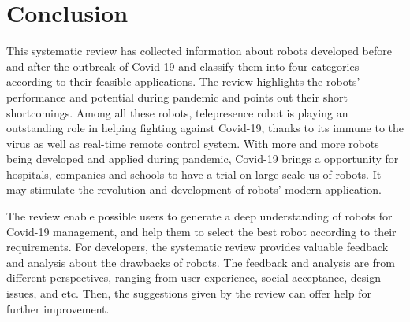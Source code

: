 \documentclass[a4paper]{article}
\begin{document}
\section{Conclusion}
    This systematic review has collected information about robots developed before and after the outbreak of Covid-19 and classify them into four categories according to their feasible applications. The review highlights the robots' performance and potential during pandemic and points out their short shortcomings. Among all these robots, telepresence robot is playing an outstanding role in helping fighting against Covid-19, thanks to its immune to the virus as well as real-time remote control system. With more and more robots being developed and applied during pandemic, Covid-19 brings a opportunity for hospitals, companies and schools to have a trial on large scale us of robots. It may stimulate the revolution and development of robots' modern application. 
    \par The review enable possible users to generate a deep understanding of robots for Covid-19 management, and help them to select the best robot according to their requirements. For developers, the systematic review provides valuable feedback and analysis about the drawbacks of robots. The feedback and analysis are from different perspectives, ranging from user experience, social acceptance, design issues, and etc. Then, the suggestions given by the review can offer help for further improvement.
\end{document}

